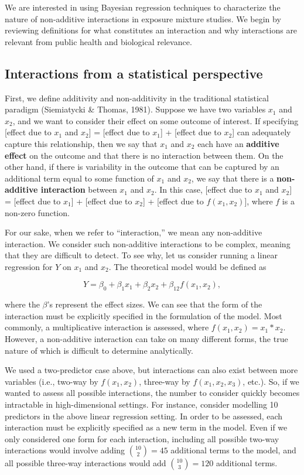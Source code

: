 \documentclass[12pt, twoside]{amherstthesis}
\begin{document}
We are interested in using Bayesian regression techniques to characterize the nature of non-additive interactions in exposure mixture studies. We begin by reviewing definitions for what constitutes an interaction and why interactions are relevant from public health and biological relevance.

\hypertarget{interactions-from-a-statistical-perspective}{%
\subsection{Interactions from a statistical perspective}\label{interactions-from-a-statistical-perspective}}

First, we define additivity and non-additivity in the traditional statistical paradigm (Siemiatycki \& Thomas, 1981). Suppose we have two variables \(x_1\) and \(x_2\), and we want to consider their effect on some outcome of interest. If specifying {[}effect due to \(x_1\) and \(x_2\){]} = {[}effect due to \(x_1\){]} + {[}effect due to \(x_2\){]} can adequately capture this relationship, then we say that \(x_1\) and \(x_2\) each have an \textbf{additive effect} on the outcome and that there is no interaction between them. On the other hand, if there is variability in the outcome that can be captured by an additional term equal to some function of \(x_1\) and \(x_2\), we say that there is a \textbf{non-additive interaction} between \(x_1\) and \(x_2\). In this case, {[}effect due to \(x_1\) and \(x_2\){]} = {[}effect due to \(x_1\){]} + {[}effect due to \(x_2\){]} + {[}effect due to \(f(x_1, x_2)\){]}, where \(f\) is a non-zero function.

For our sake, when we refer to ``interaction,'' we mean any non-additive interaction. We consider such non-additive interactions to be complex, meaning that they are difficult to detect. To see why, let us consider running a linear regression for \(Y\) on \(x_1\) and \(x_2\). The theoretical model would be defined as

\[
Y = \beta_0+\beta_1x_1+\beta_2x_2 + \beta_{12}f(x_1, x_2),
\]

\noindent where the \(\beta\)'s represent the effect sizes. We can see that the form of the interaction must be explicitly specified in the formulation of the model. Most commonly, a multiplicative interaction is assessed, where \(f(x_1, x_2) = x_1*x_2\). However, a non-additive interaction can take on many different forms, the true nature of which is difficult to determine analytically.

We used a two-predictor case above, but interactions can also exist between more variables (i.e., two-way by \(f(x_1, x_2)\), three-way by \(f(x_1, x_2, x_3)\), etc.). So, if we wanted to assess all possible interactions, the number to consider quickly becomes intractable in high-dimensional settings. For instance, consider modelling 10 predictors in the above linear regression setting. In order to be assessed, each interaction must be explicitly specified as a new term in the model. Even if we only considered one form for each interaction, including all possible two-way interactions would involve adding \(\binom{10}{2} = 45\) additional terms to the model, and all possible three-way interactions would add \(\binom{10}{3} = 120\) additional terms.
\end{document}
